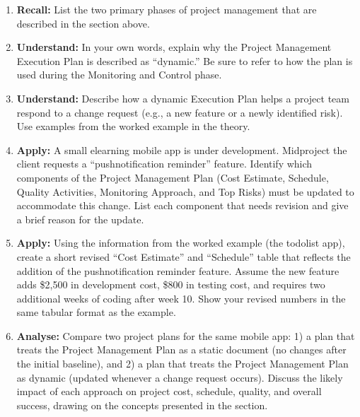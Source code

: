 \documentclass[12pt, a4paper]{article}
\begin{document}
\begin{enumerate}
\item \textbf{Recall:} List the two primary phases of project management that are described in the section above.

\newpage

\item \textbf{Understand:} In your own words, explain why the Project Management Execution Plan is described as ``dynamic.'' Be sure to refer to how the plan is used during the Monitoring and Control phase.

\newpage

\item \textbf{Understand:} Describe how a dynamic Execution Plan helps a project team respond to a change request (e.g., a new feature or a newly identified risk). Use examples from the worked example in the theory.

\newpage

\item \textbf{Apply:} A small elearning mobile app is under development. Midproject the client requests a ``pushnotification reminder'' feature.  
Identify which components of the Project Management Plan (Cost Estimate, Schedule, Quality Activities, Monitoring Approach, and Top Risks) must be updated to accommodate this change. List each component that needs revision and give a brief reason for the update.

\newpage

\item \textbf{Apply:} Using the information from the worked example (the todolist app), create a short revised ``Cost Estimate'' and ``Schedule'' table that reflects the addition of the pushnotification reminder feature. Assume the new feature adds \$2,500 in development cost, \$800 in testing cost, and requires two additional weeks of coding after week 10. Show your revised numbers in the same tabular format as the example.

\newpage

\item \textbf{Analyse:} Compare two project plans for the same mobile app:  
1) a plan that treats the Project Management Plan as a static document (no changes after the initial baseline), and  
2) a plan that treats the Project Management Plan as dynamic (updated whenever a change request occurs).  
Discuss the likely impact of each approach on project cost, schedule, quality, and overall success, drawing on the concepts presented in the section.


\end{enumerate}
\end{document}
